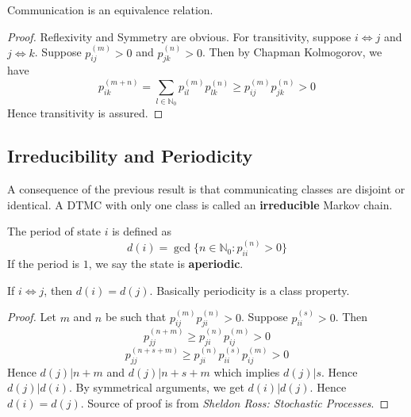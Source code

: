 \documentclass[a4paper,10pt]{article}
\begin{document}
\begin{prop}
Communication is an equivalence relation. 
\end{prop}
\begin{proof}
Reflexivity and Symmetry are obvious. For transitivity, suppose $i \iff j$ and $j \iff k$. Suppose $p_{ij}^{(m)} >0$ and $p_{jk}^{(n)} >0$. Then by Chapman Kolmogorov, we have
\[p_{ik}^{(m+n)} = \sum_{l \in \mathbb{N}_0} p_{il}^{(m)}p_{lk}^{(n)} \geq p_{ij}^{(m)}p_{jk}^{(n)} >0  \]
Hence transitivity is assured.
\end{proof}

\subsection{Irreducibility and Periodicity}
A consequence of the previous result is that communicating classes are disjoint or identical. A DTMC with only one class is called an \textbf{irreducible} Markov chain.
\begin{defn}
The period of state $i$ is defined as
\[d(i) = \gcd\{n \in \mathbb{N}_0 : p_{ii}^{(n)} > 0\}\]
If the period is $1$, we say the state is \textbf{aperiodic}.
\end{defn}

\begin{prop}
If $i \iff j$, then $d(i) = d(j)$. Basically periodicity is a class property.
\end{prop}
\begin{proof}
Let $m$ and $n$ be such that $p_{ij}^{(m)}p_{ji}^{(n)} > 0$. Suppose $p_{ii}^{(s)} > 0$. Then
\[ p_{jj}^{(n+m)} \geq p_{ji}^{(n)}p_{ij}^{(m)} > 0 \]
\[ p_{jj}^{(n+s+m)} \geq p_{ji}^{(n)}p_{ii}^{(s)}p_{ij}^{(m)} > 0 \]
Hence $d(j) | n+m$ and $d(j) | n+s+m$ which implies $d(j) | s$. Hence $d(j) | d(i)$. By symmetrical arguments, we get $d(i) | d(j)$. Hence $d(i) = d(j)$.
Source of proof is from \emph{Sheldon Ross: Stochastic Processes}.
\end{proof}
\end{document}
